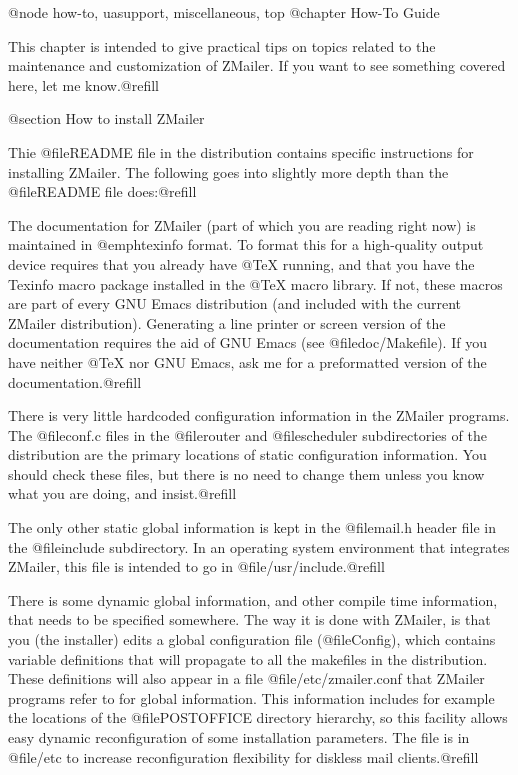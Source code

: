 {{@node how-to, uasupport, miscellaneous, top
@chapter How-To Guide

This chapter is intended to give practical tips on topics related to the
maintenance and customization of ZMailer.  If you want to see something
covered here, let me know.@refill

@section How to install ZMailer

Thie @file{README} file in the distribution contains specific instructions
for installing ZMailer.  The following goes into slightly more depth than the
@file{README} file does:@refill

The documentation for ZMailer (part of which you are reading right now) is
maintained in @emph{texinfo} format.  To format this for a high-quality output
device requires that you already have @TeX{} running, and that you have the
Texinfo macro package installed in the @TeX{} macro library.  If not, these
macros are part of every GNU Emacs distribution (and included with the
current ZMailer distribution).  Generating a line printer or screen version
of the documentation requires the aid of GNU Emacs (see @file{doc/Makefile}).
If you have neither @TeX{} nor GNU Emacs, ask me for a preformatted version
of the documentation.@refill

There is very little hardcoded configuration information in the ZMailer
programs.  The @file{conf.c} files in the @file{router} and @file{scheduler}
subdirectories of the distribution are the primary locations of static
configuration information.  You should check these files, but there is no
need to change them unless you know what you are doing, and insist.@refill

The only other static global information is kept in the @file{mail.h} header
file in the @file{include} subdirectory.  In an operating system environment
that integrates ZMailer, this file is intended to go in
@file{/usr/include}.@refill

There is some dynamic global information, and other compile time information, 
that needs to be specified somewhere.  The way it is done with ZMailer, is
that you (the installer) edits a global configuration file (@file{Config}),
which contains variable definitions that will propagate to all the makefiles
in the distribution.  These definitions will also appear in a file
@file{/etc/zmailer.conf} that ZMailer programs refer to for global
information.  This information includes for example the locations of the
@file{POSTOFFICE} directory hierarchy, so this facility allows easy
dynamic reconfiguration of some installation parameters.  The file is in
@file{/etc} to increase reconfiguration flexibility for diskless mail
clients.@refill

}}
